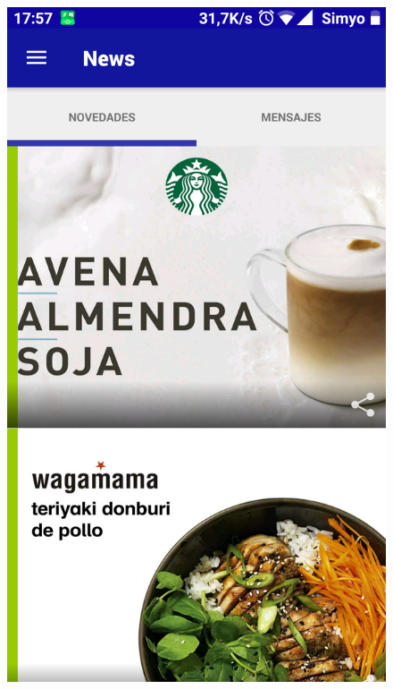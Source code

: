 \documentclass[twoside]{report}
\begin{document}
\begin{figure}[H]
\begin{center}
\includegraphics[scale=0.10]{images/restaurantes/vips1.png}

\end{center}
\end{figure}
\end{document}
